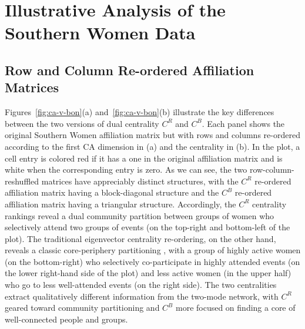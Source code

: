 \documentclass[a4paper,fleqn]{cas-sc}
\begin{document}
\section{Illustrative Analysis of the Southern Women Data}
\subsection{Row and Column Re-ordered Affiliation Matrices}
Figures~\ref{fig:ca-v-bon}(a) and~\ref{fig:ca-v-bon}(b) illustrate the key differences between the two versions of dual centrality $C^R$ and $C^B$. Each panel shows the original Southern Women affiliation matrix but with rows and columns re-ordered according to the first CA dimension in (a) and the \citet{bonacich1991simultaneous} centrality in (b). In the plot, a cell entry is colored red if it has a one in the original affiliation matrix and is white when the corresponding entry is zero. As we can see, the two row-column-reshuffled matrices have appreciably distinct structures, with the $C^R$ re-ordered affiliation matrix having a block-diagonal structure and the $C^B$ re-ordered affiliation matrix having a triangular structure. Accordingly, the $C^R$ centrality rankings reveal a dual community partition between groups of women who selectively attend two groups of events (on the top-right and bottom-left of the plot). The traditional eigenvector centrality re-ordering, on the other hand, reveals a classic core-periphery partitioning \citep{borgatti2000models}, with a group of highly active women (on the bottom-right) who selectively co-participate in highly attended events (on the lower right-hand side of the plot) and less active women (in the upper half) who go to less well-attended events (on the right side). The two centralities extract qualitatively different information from the two-mode network, with $C^R$ geared toward community partitioning and $C^B$ more focused on finding a core of well-connected people and groups. 
\end{document}
